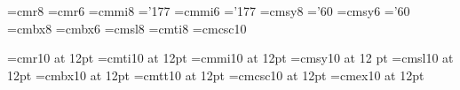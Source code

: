 
\def\memoheader#1#2{\title{#2}
  {\noindent {\nraofont National Radio Astronomy Observatory} 
   \hfill {\sl MEMORANDUM}}
  \vskip 3pt
  \hrule height1pt
  \vskip 6pt
  {\parindent=0pt\parskip=0pt
  \line{{\it To:}\hskip2.48em #1
  \hfil {\it Date:\/}\hskip0.5em \today}
  \vskip 4pt
  {\it From:}\hskip1.36em \sender
  \vskip 4pt                         
  {\it Subject:\/}\hskip0.5em  #2}
  \vskip 6pt
  \hrule height1pt
  \vskip 20pt}


\def\nnarrower{\advance\leftskip by 50pt\advance\rightskip by 45pt}
\def \ndot{\nnarrower\parindent=0pt\itemitem{$\bullet\,$}}
\def\nndot#1{{\nnarrower\parindent=0pt\itemitem{$\bullet\,$}#1}}
\def\nodot{\nnarrower\parindent=0pt\itemitem{o\ \/}}  %


\def\beginoutline{
  \frenchspacing
  \parskip=0pt plus 1pt \parindent=0.25in
  \def\in{\par\indent \hangindent2\parindent \textindent}    %
  \def\inin{\par\indent \indent \hangindent3\parindent \textindent}} 



\font\eightrm=cmr8
\font\sixrm=cmr6
\font\eighti=cmmi8 \skewchar\eighti='177
\font\sixi=cmmi6 \skewchar\sixi='177
\font\eightsy=cmsy8 \skewchar\eightsy='60
\font\sixsy=cmsy6 \skewchar\sixsy='60
\font\eightbf=cmbx8
\font\sixbf=cmbx6
\font\eightsl=cmsl8
\font\eightit=cmti8
\font\tensmc=cmcsc10

\font\twelverm=cmr10 at 12pt		%
\font\twelveit=cmti10 at 12pt		%
\font\twelvei=cmmi10 at 12pt		%
\font\twelvesy=cmsy10 at 12 pt		%
\font\twelvesl=cmsl10 at 12pt		%
\font\twelvebf=cmbx10 at 12pt		%
\font\twelvett=cmtt10 at 12pt		%
\font\twelvesmc=cmcsc10 at 12pt		%
\font\twelveex=cmex10 at 12pt		%

